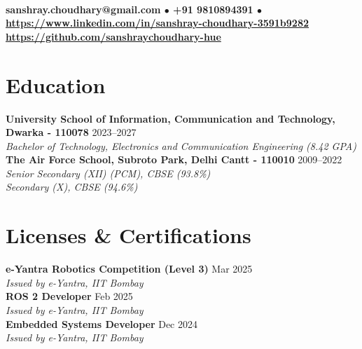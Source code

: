 \documentclass[10pt,a4paper]{article}%
\begin{document}
%
\normalsize%
 \vspace{3pt}\\%
\noindent \textbf{\scriptsize sanshray.choudhary@gmail.com $\bullet$ +91 9810894391 $\bullet$ \href{https://www.linkedin.com/in/sanshray-choudhary-3591b9282}{https://www.linkedin.com/in/sanshray-choudhary-3591b9282} \\ \href{https://github.com/sanshraychoudhary-hue}{https://github.com/sanshraychoudhary-hue}} \vspace{10pt}%
\section*{Education}%
\noindent \textbf{University School of Information, Communication and Technology, Dwarka - 110078} \hfill 2023--2027 \\%
\indent \textit{Bachelor of Technology, Electronics and Communication Engineering (8.42 GPA)} \vspace{8pt}\\%
\noindent \textbf{The Air Force School, Subroto Park, Delhi Cantt - 110010} \hfill 2009--2022 \\%
\indent \textit{Senior Secondary (XII) (PCM), CBSE (93.8\%)} \\%
\indent \textit{Secondary (X), CBSE (94.6\%)} \vspace{8pt}%
\section*{Licenses \& Certifications}%
\noindent \textbf{e-Yantra Robotics Competition (Level 3)} \hfill Mar 2025 \\%
\indent \textit{Issued by e-Yantra, IIT Bombay} \vspace{8pt}\\%
\noindent \textbf{ROS 2 Developer} \hfill Feb 2025 \\%
\indent \textit{Issued by e-Yantra, IIT Bombay} \vspace{8pt}\\%
\noindent \textbf{Embedded Systems Developer} \hfill Dec 2024 \\%
\indent \textit{Issued by e-Yantra, IIT Bombay} \vspace{8pt}%
\end{document}
